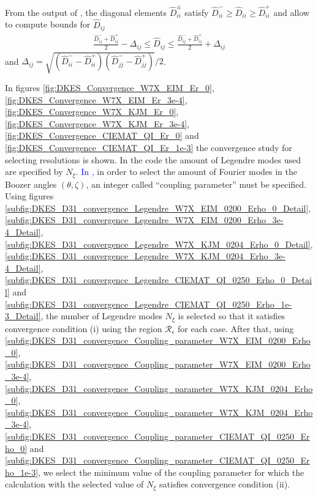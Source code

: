 From the output of {\DKES}, the diagonal elements $\widehat{D}_{ii}^{\pm}$ satisfy $\widehat{D}_{ii}^{-} \ge \widehat{D}_{ii} \ge\widehat{D}_{ii}^{+}$ and allow to compute bounds for $\widehat{D}_{ij}$
%
\begin{align}
	\frac{\widehat{D}_{ij}^{-} + \widehat{D}_{ij}^{+}}{2}
	-
	\Delta_{ij}
	\le
	\widehat{D}_{ij}
	\le
	\frac{\widehat{D}_{ij}^{-} + \widehat{D}_{ij}^{+}}{2}
	+
	\Delta_{ij}
\end{align}
and $\Delta_{ij} = \sqrt{(\widehat{D}_{ii}^{-} - \widehat{D}_{ii}^{+})(\widehat{D}_{jj}^{-} - \widehat{D}_{jj}^{+})} /2 $.  

 In figures \ref{fig:DKES_Convergence_W7X_EIM_Er_0}, \ref{fig:DKES_Convergence_W7X_EIM_Er_3e-4}, \ref{fig:DKES_Convergence_W7X_KJM_Er_0}, \ref{fig:DKES_Convergence_W7X_KJM_Er_3e-4}, \ref{fig:DKES_Convergence_CIEMAT_QI_Er_0} and \ref{fig:DKES_Convergence_CIEMAT_QI_Er_1e-3} the convergence study for selecting {\DKES} resolutions is shown. In the code {\DKES} the amount of Legendre modes used are specified by $N_\xi$. \textcolor{blue}{In {\DKES},} in order to select the amount of Fourier modes in the Boozer angles $(\theta,\zeta)$, an integer called ``coupling parameter'' must be specified. Using figures \ref{subfig:DKES_D31_convergence_Legendre_W7X_EIM_0200_Erho_0_Detail}, \ref{subfig:DKES_D31_convergence_Legendre_W7X_EIM_0200_Erho_3e-4_Detail}, \ref{subfig:DKES_D31_convergence_Legendre_W7X_KJM_0204_Erho_0_Detail}, \ref{subfig:DKES_D31_convergence_Legendre_W7X_KJM_0204_Erho_3e-4_Detail}, \ref{subfig:DKES_D31_convergence_Legendre_CIEMAT_QI_0250_Erho_0_Detail} and \ref{subfig:DKES_D31_convergence_Legendre_CIEMAT_QI_0250_Erho_1e-3_Detail}, the number of Legendre modes $N_\xi$ is selected so that it satisfies convergence condition (i) using the region $\mathcal{R}_\epsilon$ for each case. After that, using \ref{subfig:DKES_D31_convergence_Coupling_parameter_W7X_EIM_0200_Erho_0}, \ref{subfig:DKES_D31_convergence_Coupling_parameter_W7X_EIM_0200_Erho_3e-4}, \ref{subfig:DKES_D31_convergence_Coupling_parameter_W7X_KJM_0204_Erho_0}, \ref{subfig:DKES_D31_convergence_Coupling_parameter_W7X_KJM_0204_Erho_3e-4}, \ref{subfig:DKES_D31_convergence_Coupling_parameter_CIEMAT_QI_0250_Erho_0} and \ref{subfig:DKES_D31_convergence_Coupling_parameter_CIEMAT_QI_0250_Erho_1e-3}, we select the minimum value of the coupling parameter for which the calculation with the selected value of $N_\xi$ satisfies convergence condition (ii).
 
 
%
%
%
%
%


